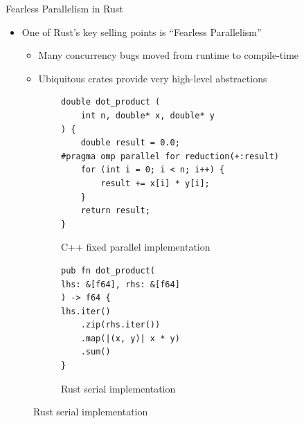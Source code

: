 \documentclass[10pt,aspectratio=169]{beamer}
\begin{document}
\begin{frame}{Fearless Parallelism in Rust}
    \begin{itemize}
        \item<1-> One of Rust's key selling points is ``Fearless Parallelism''
        \begin{itemize}
            \item Many concurrency bugs moved from runtime to compile-time
            \item Ubiquitous crates provide very high-level abstractions
        \end{itemize}
    \end{itemize}    
    \vspace*{0.15cm}

    \begin{figure}
        \begin{subfigure}[c]{.55\textwidth}\centering
            \begin{verbatim}
double dot_product (
    int n, double* x, double* y
) {
    double result = 0.0;
#pragma omp parallel for reduction(+:result)
    for (int i = 0; i < n; i++) {
        result += x[i] * y[i];
    }
    return result;
}
            \end{verbatim}
            \label{fig:cpp-ddot-openmp-reduction}
            \vspace*{-0.5cm}
            \caption{C++ fixed parallel implementation}
        \end{subfigure}%
        \begin{subfigure}[c]{.45\textwidth}\centering
            \begin{verbatim}
pub fn dot_product(
lhs: &[f64], rhs: &[f64]
) -> f64 {
lhs.iter()
    .zip(rhs.iter())
    .map(|(x, y)| x * y)
    .sum()
}
            \end{verbatim}
            \label{fig:rust-ddot-serial-3}
            \vspace*{1.15cm}
            \caption{Rust serial implementation}
        \end{subfigure}
    \end{figure}
\end{frame}
\end{document}
